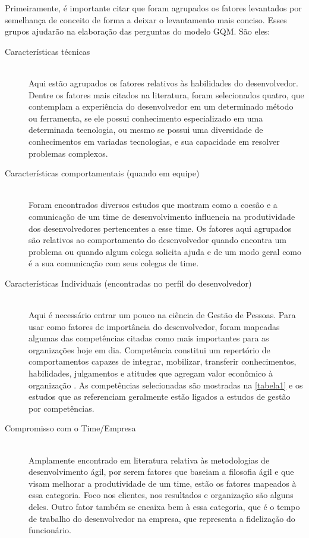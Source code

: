 Primeiramente, é importante citar que foram agrupados os fatores levantados por semelhança de conceito de forma a deixar o levantamento mais conciso. Esses grupos ajudarão na elaboração das perguntas do modelo GQM. São eles:


\begin{description}
	\item[Características técnicas] \hfill \\
	Aqui estão agrupados os fatores relativos às habilidades do desenvolvedor. Dentre os fatores mais citados na literatura, foram selecionados quatro, que contemplam a experiência do desenvolvedor em um determinado método ou ferramenta, se ele possui conhecimento especializado em uma determinada tecnologia, ou mesmo se possui uma diversidade de conhecimentos em variadas tecnologias, e sua capacidade em resolver problemas complexos.
	
	\item[Características comportamentais (quando em equipe)] \hfill \\
	Foram encontrados diversos estudos que mostram como a coesão e a comunicação de um time de desenvolvimento influencia na produtividade dos desenvolvedores pertencentes a esse time. Os fatores aqui agrupados são relativos ao comportamento do desenvolvedor quando encontra um problema ou quando algum colega solicita ajuda e de um modo geral como é a sua comunicação com seus colegas de time.
	
	\item[Características Individuais (encontradas no perfil do desenvolvedor)] \hfill \\
	Aqui é necessário entrar um pouco na ciência de Gestão de Pessoas. Para usar como fatores de importância do desenvolvedor, foram mapeadas algumas das competências citadas como mais importantes para as organizações hoje em dia. Competência constitui um repertório de comportamentos capazes de integrar, mobilizar, transferir conhecimentos, habilidades, julgamentos e atitudes que agregam valor econômico à organização \cite{Boyatzis1982, Boyatzis2008, Shirazi2009}. As competências selecionadas são mostradas na \autoref{tabela1} e os estudos que as referenciam geralmente estão ligados a estudos de gestão por competências.
	
	\item[Compromisso com o Time/Empresa] \hfill \\
	Amplamente encontrado em literatura relativa às metodologias de desenvolvimento ágil, por serem fatores que baseiam a filosofia ágil e que visam melhorar a produtividade de um time, estão os fatores mapeados à essa categoria. Foco nos clientes, nos resultados e organização são alguns deles. Outro fator também se encaixa bem à essa categoria, que é o tempo de trabalho do desenvolvedor na empresa, que representa a fidelização do funcionário.
	
\end{description}

